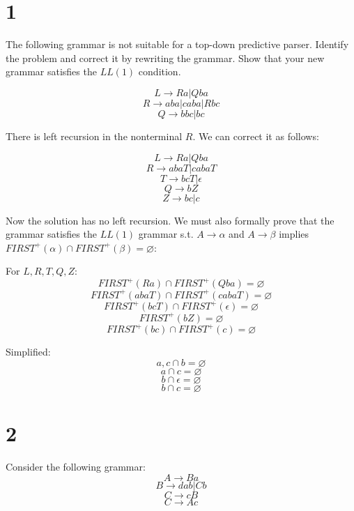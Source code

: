 \documentclass[11pt]{article}
\begin{document}
\section*{1}
The following grammar is not suitable for a top-down predictive parser. Identify the problem and correct it by rewriting the grammar. Show that your new grammar satisfies the $LL(1)$ condition.

$$L \rightarrow Ra | Qba$$
$$R \rightarrow aba | caba | Rbc$$
$$Q \rightarrow bbc | bc$$

\begin{Answer}
There is left recursion in the nonterminal $R$. We can correct it as follows:

$$L \rightarrow Ra | Qba$$
$$R \rightarrow abaT | cabaT$$
$$T \rightarrow bcT | \epsilon$$
$$Q \rightarrow bZ$$
$$Z \rightarrow bc | c$$

Now the solution has no left recursion. We must also formally prove that the grammar satisfies the $LL(1)$ grammar s.t. $A \rightarrow \alpha$ and $A \rightarrow \beta$ implies $FIRST^+(\alpha) \cap FIRST^+(\beta) = \varnothing$:

For $L, R, T, Q, Z$:
$$FIRST^+(Ra) \cap FIRST^+(Qba) = \varnothing$$
$$FIRST^+(abaT) \cap FIRST^+(cabaT) = \varnothing$$
$$FIRST^+(bcT) \cap FIRST^+(\epsilon) = \varnothing$$
$$FIRST^+(bZ) = \varnothing$$
$$FIRST^+(bc) \cap FIRST^+(c) = \varnothing$$

Simplified:
$$a, c \cap b = \varnothing$$
$$a \cap c = \varnothing$$
$$b \cap \epsilon = \varnothing$$
$$b \cap c = \varnothing$$
\end{Answer}

\newpage

\section*{2}
Consider the following grammar:
$$A \rightarrow Ba$$
$$B \rightarrow dab | Cb$$
$$C \rightarrow cB$$
$$C \rightarrow Ac$$
\end{document}
